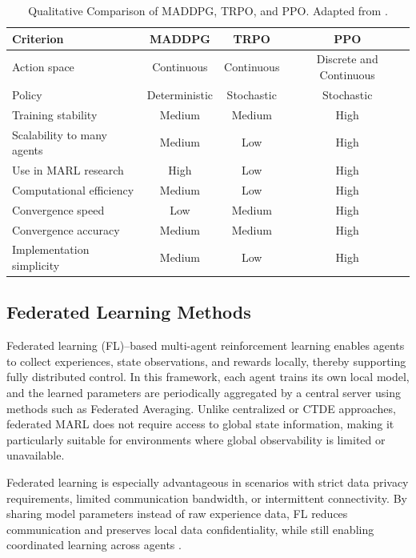 \begin{table}[htbp]
\centering
\caption{Qualitative Comparison of MADDPG, TRPO, and PPO. Adapted from \cite{ekecki2025uavcontrolsurvey}.}
\label{tab:marl_comparison_hml}
\begin{tabular}{lccc}
\hline
\textbf{Criterion} & \textbf{MADDPG} & \textbf{TRPO} & \textbf{PPO} \\
\hline
Action space  & Continuous & Continuous & Discrete and Continuous \\
Policy  & Deterministic & Stochastic & Stochastic \\
Training stability & Medium & Medium & High \\
Scalability to many agents & Medium & Low & High \\
Use in MARL research & High & Low & High \\
Computational efficiency & Medium & Low & High \\
Convergence speed & Low & Medium & High \\
Convergence accuracy & Medium & Medium & High \\
Implementation simplicity & Medium & Low & High \\
\hline
\end{tabular}
\end{table}


\subsection{Federated Learning Methods}
Federated learning (FL)–based multi-agent reinforcement learning enables agents to collect experiences, state observations, and rewards locally, thereby supporting fully distributed control. In this framework, each agent trains its own local model, and the learned parameters are periodically aggregated by a central server using methods such as Federated Averaging. Unlike centralized or CTDE approaches, federated MARL does not require access to global state information, making it particularly suitable for environments where global observability is limited or unavailable.

Federated learning is especially advantageous in scenarios with strict data privacy requirements, limited communication bandwidth, or intermittent connectivity. By sharing model parameters instead of raw experience data, FL reduces communication and preserves local data confidentiality, while still enabling coordinated learning across agents \cite{ekecki2025uavcontrolsurvey}.


